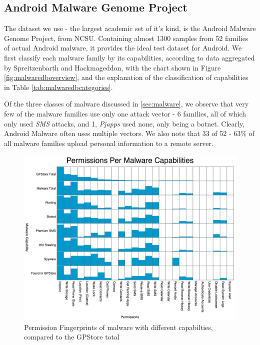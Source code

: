 \subsection{Android Malware Genome Project}
The dataset we use - the largest academic set of it's kind, is the Android Malware Genome Project\citep{zhou2012dissecting}, from NCSU. Containing almost 1300 samples from 52 families of actual Android malware, it provides the ideal test dataset for Android. We first classify each malware family by its capabilities, according to data aggregated by Spreitzenbarth\citep{spreitzenbarth2013} and Hackmageddon\citep{hackmageddon2011}, with the chart shown in Figure \ref{fig:malwaredboverview}, and the explanation of the classification of capabilities in Table \ref{tab:malwaredbcategories}.

Of the three classes of malware discussed in \ref{sec:malware}, we observe that very few of the malware families use only one attack vector - 6 families, all of which only used \textit{SMS} attacks, and 1, \textit{Pjapps} used none, only being a botnet. Clearly, Android Malware often uses multiple vectors. We also note that 33 of 52 - 63\% of all malware families upload personal information to a remote server. 

\begin{figure}[h]
\begin{center}
\includegraphics[width=1.0\columnwidth]{figs/MalwareCapabiltiesPermissions}
\caption{Permission Fingerprints of malware with different capabilties, compared to the GPStore total}
\label{fig:malwarefingerprint}
\end{center}
\end{figure}


